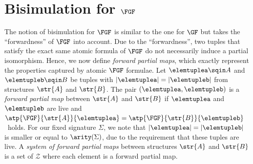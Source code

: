 \section{Bisimulation for $\FGF$}
The notion of bisimulation for $\FGF$ is similar to the one for $\GF$ but takes the ``forwardness'' of $\FGF$ into account.
Due to the ``forwardness'', two tuples that satisfy the exact same atomic formula of $\FGF$ do not necessarily induce a partial isomorphism.
Hence, we now define \emph{forward partial maps}, which exactly represent the properties captured by atomic $\FGF$ formulae.
Let $\elemtuplea \sqin A$ and $\elemtupleb \sqin B$ be tuples with $|\elemtuplea| = |\elemtupleb|$ from structures $\str{A}$ and $\str{B}$.
The pair $(\elemtuplea, \elemtupleb)$ is a \emph{forward partial map} between $\str{A}$ and $\str{B}$ if $\elemtuplea$ and $\elemtupleb$ are live and $\atp{\FGF}{\str{A}}{\elemtuplea} = \atp{\FGF}{\str{B}}{\elemtupleb}$~holds.
For our fixed signature $\Sigma$, we note that $|\elemtuplea| = |\elemtupleb|$ is smaller or equal to $\arity(\Sigma)$, due to the requirement that these tuples are live.
A \emph{system of forward partial maps} between structures $\str{A}$ and $\str{B}$ is a set of $\mathcal{Z}$ where each element is a forward partial map.

